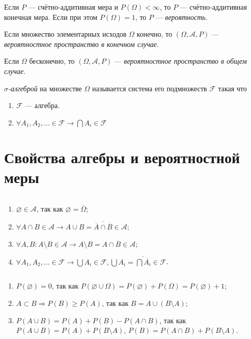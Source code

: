 \begin{define*}
  Если $P$ --- счётно-аддитивная мера и $P(\Omega) < \infty$, то $P$ --- счётно-аддитивная конечная мера.
  Если при этом $P(\Omega) = 1$, то $P$ --- \emph{вероятность}.
\end{define*}

\begin{define*}
  Если множество элементарных исходов $\Omega$ конечно, то $(\Omega, \mathcal{A}, P)$ --- \emph{вероятностное пространство в конечном случае}.

  Если $\Omega$ бесконечно, то $(\Omega, \mathcal{A}, P)$ ---  \emph{вероятностное пространство в общем случае}.
\end{define*}

\begin{define*}
  \emph{$\sigma$-алгеброй} на множестве $\Omega$ называется система его подмножеств $\mathcal{F}$ такая что
  \begin{enumerate}
	\item $\mathcal{F} $ --- алгебра.
	\item $\forall	A_1, A_2, \ldots \in \mathcal{F} \to \bigcap A_i \in \mathcal{F}$
  \end{enumerate}
\end{define*}

\section{Свойства алгебры и вероятностной меры}

\begin{remark*} $ $
  \begin{enumerate}
	\item $\varnothing \in \mathcal{A}$, так как $\varnothing = \overline{\Omega}$;
	\item $\forall A \cap B \in \mathcal{A}  \to  A \cup B = \overline{ \overline{A} \cap \overline{B} } \in \mathcal{A}$;
	\item $\forall A, B: A \setminus B \in \mathcal{A} \to A \setminus B = A \cap \overline{B} \in \mathcal{A} $;
	\item $\forall A_1, A_2, \ldots \in \mathcal{F}  \to \bigcup A_i \in \mathcal{F}, \bigcup A_i = \overline{\bigcap\overline{A_i}} \in \mathcal{F}$.
  \end{enumerate}
\end{remark*}

\begin{remark*} $ $
  \begin{enumerate}
	\item $P(\varnothing) = 0$, так как $P(\varnothing \cup \Omega) = P(\varnothing) + P(\Omega) = P(\varnothing) + 1$;
	\item $A \subset B \Rightarrow P(B) \ge P(A)$, так как $B = A \cup (B\setminus A)$;
	\item $P(A \cup B) = P(A) + P(B) - P(A \cap B)$, так как $P(A\cup B) = P(A) + P(B\setminus A)$, $P(B) = P(A \cap B) + P(B \setminus A)$.
  \end{enumerate}
\end{remark*}

